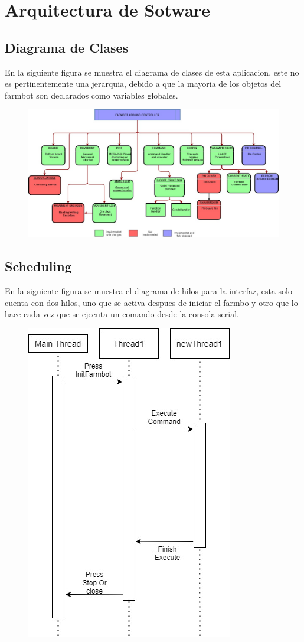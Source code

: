 \documentclass[letterpaper,12pt]{article}
\begin{document}
	
	\section{Arquitectura de Sotware}

	
	\subsection{Diagrama de Clases}
	En la siguiente figura se muestra el diagrama de clases de esta aplicacion, este no es pertinentemente una jerarquia, debido a que la mayoria de los objetos del farmbot son declarados como variables globales.
		\begin{figure}[H]
		\centering
		\includegraphics[width=1\linewidth]{images/ArduinoFirmwareFarmbot}
		\label{fig:arduinofirmwarefarmbot}
	\end{figure}
	\subsection{Scheduling}
	En la siguiente figura se muestra el diagrama de hilos para la interfaz, esta solo cuenta con dos hilos, uno que se activa despues de iniciar el farmbo y otro que lo hace cada vez que se ejecuta un comando desde la consola serial.
	\begin{figure}[H]
		\centering
		\includegraphics[width=0.5\linewidth]{images/hilos_desarrollador}
		\label{fig:hilosdesarrollador}
	\end{figure}
	
\end{document}
